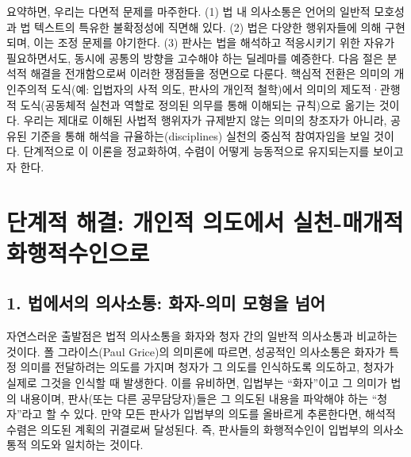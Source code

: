 \documentclass[12pt,a4paper]{article}
\begin{document}
요약하면, 우리는 다면적 문제를 마주한다. (1) 법 내 의사소통은 언어의
일반적 모호성과 법 텍스트의 특유한 불확정성에 직면해 있다. (2) 법은
다양한 행위자들에 의해 구현되며, 이는 조정 문제를 야기한다. (3) 판사는
법을 해석하고 적응시키기 위한 자유가 필요하면서도, 동시에 공통의 방향을
고수해야 하는 딜레마를 예증한다. 다음 절은 분석적 해결을 전개함으로써
이러한 쟁점들을 정면으로 다룬다. 핵심적 전환은 의미의 \textsf{개인주의적}
도식(예: 입법자의 사적 의도, 판사의 개인적 철학)에서 의미의
\textsf{제도적}·\textsf{관행적} 도식(공동체적 실천과 역할로 정의된 의무를
통해 이해되는 규칙)으로 옮기는 것이다. 우리는 제대로 이해된 사법적
행위자가 규제받지 않는 의미의 창조자가 아니라, 공유된 기준을 통해 해석을
\textsf{규율하는(disciplines)} 실천의 중심적 참여자임을 보일 것이다.
단계적으로 이 이론을 정교화하여, 수렴이 어떻게 능동적으로 유지되는지를
보이고자 한다.

\section{단계적 해결: 개인적 의도에서 실천-매개적
화행적수인으로}

\subsection{1. 법에서의 의사소통: 화자-의미 모형을
넘어}

자연스러운 출발점은 법적 의사소통을 화자와 청자 간의 일반적 의사소통과
비교하는 것이다. 폴 그라이스(Paul Grice)의 의미론에 따르면, 성공적인
의사소통은 화자가 특정 의미를 전달하려는 의도를 가지며 청자가 그 의도를
인식하도록 의도하고, 청자가 실제로 그것을 인식할 때
발생한다\autocite{grice1957,grice1989}. 이를 유비하면, 입법부는
``화자''이고 그 의미가 법의 내용이며, 판사(또는 다른 공무담당자)들은 그
의도된 내용을 파악해야 하는 ``청자''라고 할 수 있다. 만약 모든 판사가
입법부의 의도를 올바르게 추론한다면, 해석적 수렴은 의도된 계획의
귀결로써 달성된다. 즉, 판사들의 화행적수인이 입법부의 의사소통적 의도와
일치하는 것이다.
\end{document}
